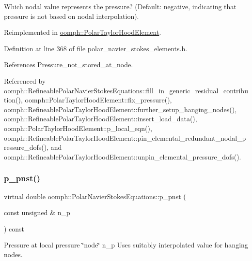 Which nodal value represents the pressure? (Default\+: negative, indicating that pressure is not based on nodal interpolation). 



Reimplemented in \hyperlink{classoomph_1_1PolarTaylorHoodElement_af7ced5d7811bc4f5f5d86c211cb40500}{oomph\+::\+Polar\+Taylor\+Hood\+Element}.



Definition at line 368 of file polar\+\_\+navier\+\_\+stokes\+\_\+elements.\+h.



References Pressure\+\_\+not\+\_\+stored\+\_\+at\+\_\+node.



Referenced by oomph\+::\+Refineable\+Polar\+Navier\+Stokes\+Equations\+::fill\+\_\+in\+\_\+generic\+\_\+residual\+\_\+contribution(), oomph\+::\+Polar\+Taylor\+Hood\+Element\+::fix\+\_\+pressure(), oomph\+::\+Refineable\+Polar\+Taylor\+Hood\+Element\+::further\+\_\+setup\+\_\+hanging\+\_\+nodes(), oomph\+::\+Refineable\+Polar\+Taylor\+Hood\+Element\+::insert\+\_\+load\+\_\+data(), oomph\+::\+Polar\+Taylor\+Hood\+Element\+::p\+\_\+local\+\_\+eqn(), oomph\+::\+Refineable\+Polar\+Taylor\+Hood\+Element\+::pin\+\_\+elemental\+\_\+redundant\+\_\+nodal\+\_\+pressure\+\_\+dofs(), and oomph\+::\+Refineable\+Polar\+Taylor\+Hood\+Element\+::unpin\+\_\+elemental\+\_\+pressure\+\_\+dofs().

\mbox{\label{classoomph_1_1PolarNavierStokesEquations_a4db8f8149fe830b204de3c5f64fd3113}} 
\subsubsection{\texorpdfstring{p\+\_\+pnst()}{p\_pnst()}}
{\footnotesize\ttfamily virtual double oomph\+::\+Polar\+Navier\+Stokes\+Equations\+::p\+\_\+pnst (\begin{DoxyParamCaption}\item[{const unsigned \&}]{n\+\_\+p }\end{DoxyParamCaption}) const\hspace{0.3cm}{\ttfamily [pure virtual]}}



Pressure at local pressure \char`\"{}node\char`\"{} n\+\_\+p Uses suitably interpolated value for hanging nodes. 



